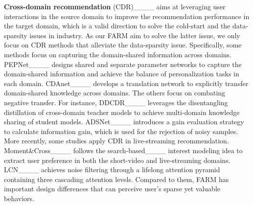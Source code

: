 \textbf{Cross-domain recommendation} (CDR)____ aims at leveraging user interactions in the source domain to improve the recommendation performance in the target domain, which is a valid direction to solve the cold-start and the data-sparsity issues in industry. 
As our FARM aim to solve the latter issue, we only focus on CDR methods that alleviate the data-sparsity issue. 
Specifically, some methods focus on capturing the domain-shared information across domains. PEPNet____ designs shared and separate parameter networks to capture the domain-shared information and achieve the balance of personalization tasks in each domain. 
CDAnet____ develops a translation network to explicitly transfer domain-shared knowledge across domains.
The others focus on combating negative transfer. For instance, DDCDR____ leverages the disentangling distillation of cross-domain teacher models to achieve multi-domain knowledge sharing of student models.  
ADSNet____ introduces a gain evaluation strategy to calculate information gain, which is used for the rejection of noisy samples.
More recently, some studies apply CDR in live-streaming recommendation. Moment\&Cross____ follows the search-based____ interest modeling idea to extract user preference in both the short-video and live-streaming domains. LCN____ achieves noise filtering through a lifelong attention pyramid containing three cascading attention levels. Compared to them, FARM has important design differences that can perceive user's sparse yet valuable behaviors.





